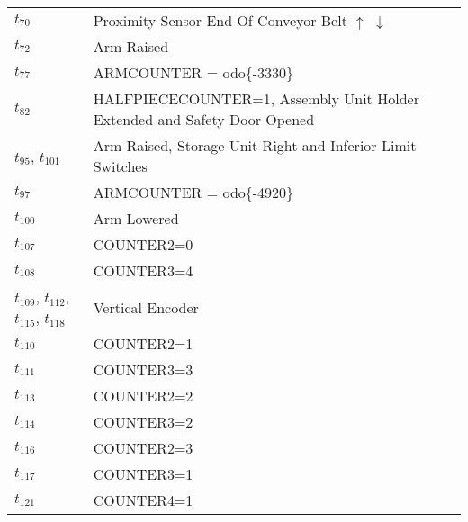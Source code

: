 \begin{longtable}{M{5cm}M{10cm}}
\hyperlink{completeNet:t70}{\hypertarget{completeTable:t70}{$t_{70}$}} & Proximity Sensor End Of Conveyor Belt \(\uparrow\) \(\downarrow\)\\
\hyperlink{completeNet:t72}{\hypertarget{completeTable:t72}{$t_{72}$}} & Arm Raised\\
\hyperlink{completeNet:t77}{\hypertarget{completeTable:t77}{$t_{77}$}} & ARMCOUNTER = 	odo\{-3330\}\\
\hyperlink{completeNet:t82}{\hypertarget{completeTable:t82}{$t_{82}$}} & HALFPIECECOUNTER=1, Assembly Unit Holder Extended and Safety Door Opened\\
\hyperlink{completeNet:t95}{\hypertarget{completeTable:t95}{$t_{95}$}}, \hyperlink{completeNet:t101}{\hypertarget{completeTable:t101}{$t_{101}$}} & Arm Raised, Storage Unit Right and Inferior Limit Switches\\
\hyperlink{completeNet:t97}{\hypertarget{completeTable:t97}{$t_{97}$}} & ARMCOUNTER = 	odo\{-4920\}\\
\hyperlink{completeNet:t100}{\hypertarget{completeTable:t100}{$t_{100}$}} & Arm Lowered\\
\hyperlink{completeNet:t107}{\hypertarget{completeTable:t107}{$t_{107}$}} & COUNTER2=0\\
\hyperlink{completeNet:t108}{\hypertarget{completeTable:t108}{$t_{108}$}} & COUNTER3=4\\
\hyperlink{completeNet:t109}{\hypertarget{completeTable:t109}{$t_{109}$}}, \hyperlink{completeNet:t112}{\hypertarget{completeTable:t112}{$t_{112}$}}, \hyperlink{completeNet:t115}{\hypertarget{completeTable:t115}{$t_{115}$}}, \hyperlink{completeNet:t118}{\hypertarget{completeTable:t118}{$t_{118}$}} & Vertical Encoder\\
\hyperlink{completeNet:t110}{\hypertarget{completeTable:t110}{$t_{110}$}} & COUNTER2=1\\
\hyperlink{completeNet:t111}{\hypertarget{completeTable:t111}{$t_{111}$}} & COUNTER3=3\\
\hyperlink{completeNet:t113}{\hypertarget{completeTable:t113}{$t_{113}$}} & COUNTER2=2\\
\hyperlink{completeNet:t114}{\hypertarget{completeTable:t114}{$t_{114}$}} & COUNTER3=2\\
\hyperlink{completeNet:t116}{\hypertarget{completeTable:t116}{$t_{116}$}} & COUNTER2=3\\
\hyperlink{completeNet:t117}{\hypertarget{completeTable:t117}{$t_{117}$}} & COUNTER3=1\\
\hyperlink{completeNet:t121}{\hypertarget{completeTable:t121}{$t_{121}$}} & COUNTER4=1\\

\end{longtable}
